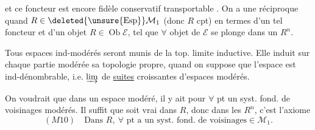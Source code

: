 et ce foncteur est encore fidèle conservatif transportable .  On a une réciproque quand $R\in\deleted{\unsure{\operatorname{Esp}}}\mathcal M_1$ (donc $R$ cpt) en termes d'un tel foncteur et d'un objet $R\in\operatorname{Ob}\mathcal E$, tel que $\forall$ objet de $\mathcal E$ se plonge dans un $R^n$.

Tous espaces ind-modérés seront munis de la top. limite inductive. Elle induit sur chaque partie modérée sa topologie propre, quand on suppose que l'espace est ind-dénombrable, i.e. $\varinjlim$ de \uline{suites} croissantes d'espaces modérés.

On voudrait que dans un espace modéré, il y ait pour $\forall$ pt un syst. fond. de voisinages  modérés. Il suffit que   soit vrai dans $R$, donc dans les $R^n$, c'est l'axiome
\[
 (M10)\quad\text{Dans }R,\ \forall\text{ pt a un syst. fond. de voisinages}\in\mathcal M_1.
\]
